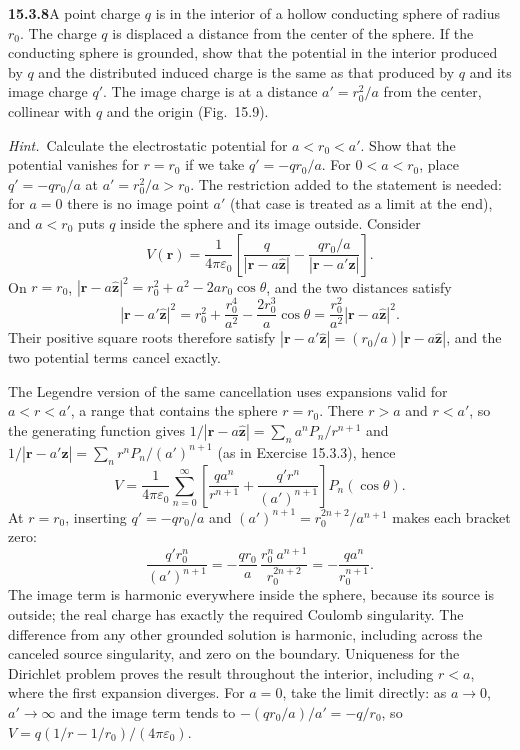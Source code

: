 \par\bigskip
\noindent\textbf{15.3.8}\quad A point charge $q$ is in the interior of
a hollow conducting sphere of radius $r_{0}$. The charge $q$ is
displaced a distance  from the center of the sphere. If the
conducting sphere is grounded, show that the potential in the
interior produced by $q$ and the distributed induced charge is the
same as that produced by $q$ and its image charge $q'$. The image
charge is at a distance $a'=r_{0}^{2}/a$ from the center, collinear
with $q$ and the origin (Fig.~15.9).
\par\emph{Hint.}~Calculate the electrostatic potential for
$a<r_{0}<a'$. Show that the potential vanishes for $r=r_{0}$ if we
take $q'=-qr_{0}/a$.
\solution
For $0<a<r_0$, place $q'=-qr_0/a$ at $a'=r_0^2/a>r_0$.
The restriction added to the statement is needed: for $a=0$ there is
no image point $a'$ (that case is treated as a limit at the end), and
$a<r_0$ puts $q$ inside the sphere and its image outside.
Consider
\[
V(\mathbf r)=\frac1{4\pi\varepsilon_0}
\left[\frac q{|\mathbf r-a\hat{\mathbf z}|}
-\frac{qr_0/a}{|\mathbf r-a'\hat{\mathbf z}|}\right].
\]
On $r=r_0$, $|\mathbf r-a\hat{\mathbf z}|^2=r_0^2+a^2-2ar_0\cos\theta$,
and the two distances satisfy
\[
|\mathbf r-a'\hat{\mathbf z}|^2
=r_0^2+\frac{r_0^4}{a^2}-\frac{2r_0^3}{a}\cos\theta
=\frac{r_0^2}{a^2}|\mathbf r-a\hat{\mathbf z}|^2.
\]
Their positive square roots therefore satisfy
$|\mathbf r-a'\hat{\mathbf z}|=(r_0/a)|\mathbf r-a\hat{\mathbf z}|$,
and the two potential terms cancel exactly.

The Legendre version of the same cancellation uses expansions valid
for $a<r<a'$, a range that contains the sphere $r=r_0$.
There $r>a$ and $r<a'$, so the generating function gives
$1/|\mathbf r-a\hat{\mathbf z}|=\sum_na^nP_n/r^{n+1}$ and
$1/|\mathbf r-a'\hat{\mathbf z}|=\sum_nr^nP_n/(a')^{n+1}$ (as in
Exercise 15.3.3), hence
\[
V=\frac1{4\pi\varepsilon_0}\sum_{n=0}^\infty
\left[\frac{qa^n}{r^{n+1}}+
\frac{q'r^n}{(a')^{n+1}}\right]P_n(\cos\theta).
\]
At $r=r_0$, inserting $q'=-qr_0/a$ and
$(a')^{n+1}=r_0^{2n+2}/a^{n+1}$ makes each bracket zero:
\[
\frac{q'r_0^n}{(a')^{n+1}}
=-\frac{qr_0}a\,\frac{r_0^n\,a^{n+1}}{r_0^{2n+2}}
=-\frac{qa^n}{r_0^{n+1}}.
\]
The image term is harmonic everywhere inside the sphere, because its
source is outside; the real charge has exactly the required Coulomb
singularity. The difference from any other grounded solution is
harmonic, including across the canceled source singularity, and zero
on the boundary. Uniqueness for the Dirichlet problem proves the result
throughout the interior, including $r<a$, where the first expansion
diverges.
For $a=0$, take the limit directly: as $a\to0$, $a'\to\infty$ and the
image term tends to $-(qr_0/a)/a'=-q/r_0$, so
$V=q(1/r-1/r_0)/(4\pi\varepsilon_0)$.


